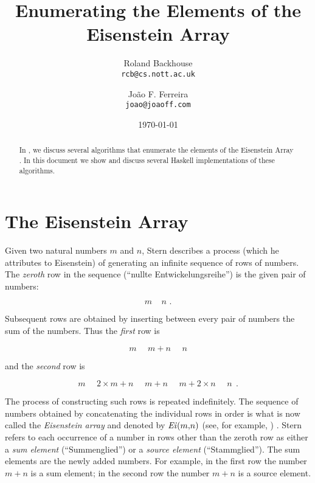 \documentclass[leqno,fleqn,12pt]{article}
\title{Enumerating the Elements of the Eisenstein Array}
\author{
   Roland Backhouse \\{\tt\small rcb@cs.nott.ac.uk} 
   \and 
   Jo\~ao F. Ferreira \\{\tt\small joao@joaoff.com}
}
\date{\today}
\begin{document}
\maketitle

\begin{abstract}
In \cite{jff*09:euclid-alg}, we discuss several algorithms that enumerate the elements of the Eisenstein 
Array \cite{stern1858:rationals}. In this document we show and discuss several Haskell implementations of these algorithms.
\end{abstract}


\section{The Eisenstein Array}
Given two natural numbers $m$ and $n$, Stern \cite{stern1858:rationals} describes a process 
(which he attributes to Eisenstein) of generating an infinite  sequence of rows of numbers.  
The \emph{zeroth}  row in the sequence (``nullte Entwickelungsreihe'') is the given pair of numbers:

\begin{displaymath}
m\ \ \ \ \ n\mbox{\ \ \ .}
\end{displaymath}

Subsequent rows are obtained by inserting between every pair of numbers the sum of the numbers.  Thus
the \emph{first} row is

\begin{displaymath}
m\ \ \ \ \ \ m{+}n\ \ \ \ \ \ n 
\end{displaymath}

and the \emph{second} row is

\begin{displaymath}
m\ \ \ \ \ \ 2{\times}m + n\ \ \ \ \ \ m{+}n\ \ \ \ \ \ m + 2{\times}n\ \ \ \ \ \ n~~. 
\end{displaymath}

The process of constructing such rows is repeated indefinitely.  The sequence of numbers obtained by
concatenating the individual rows in order is what is now called the \emph{Eisenstein array} and denoted by
 $\mathit{Ei\/}(m{,}n)$ (see, for example, \cite[sequence A064881]{sloane-integers}) .  
Stern refers to each occurrence of a number  in rows other than the
zeroth row as either  a 
\emph{sum element} (``Summenglied'')  or a  \emph{source element} (``Stammglied'').    The sum elements are the
newly added numbers.  For example, in the first row the
number $m{+}n$ is a sum element; in the second row the number $m{+}n$ is a  source element. 
\end{document}
